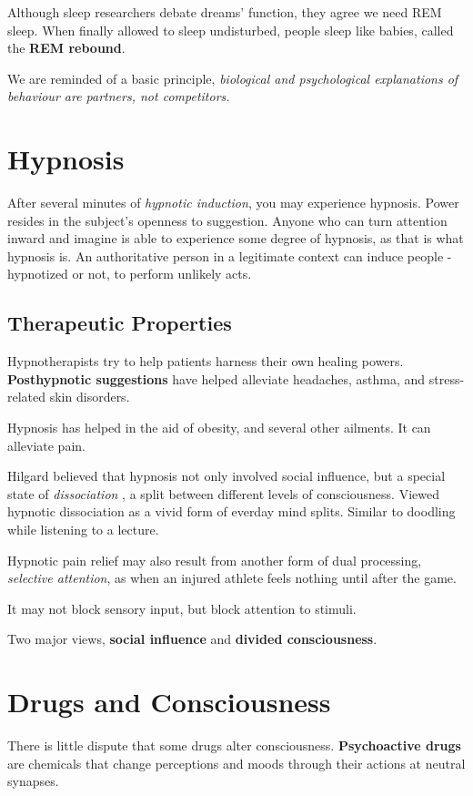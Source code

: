 \documentclass[12pt]{article}
\begin{document}
Although sleep researchers debate dreams' function, they agree we need REM sleep. When finally allowed to sleep undisturbed, people sleep like babies, called the \textbf{REM rebound}. 

We are reminded of a basic principle, \textit{biological and psychological explanations of behaviour are partners, not competitors.}

\section*{Hypnosis}
After several minutes of \textit{hypnotic induction}, you may experience hypnosis. Power resides in the subject's openness to suggestion. Anyone who can turn attention inward and imagine is able to experience some degree of hypnosis, as that is what hypnosis is. An authoritative person in a legitimate context can induce people - hypnotized or not, to perform unlikely acts.

\subsection*{Therapeutic Properties}
Hypnotherapists try to help patients harness their own healing powers. \textbf{Posthypnotic suggestions} have helped alleviate headaches, asthma, and stress-related skin disorders. 

Hypnosis has helped in the aid of obesity, and several other ailments. It can alleviate pain.

Hilgard believed that hypnosis not only involved social influence, but a special state of \textit{dissociation }, a split between different levels of consciousness. Viewed hypnotic dissociation as a vivid form of everday mind splits. Similar to doodling while listening to a lecture. 

Hypnotic pain relief may also result from another form of dual processing, \textit{selective attention}, as when an injured athlete feels nothing until after the game.

It may not block sensory input, but block attention to stimuli. 

Two major views, \textbf{social influence} and \textbf{divided consciousness}.

\section*{Drugs and Consciousness}
There is little dispute that some drugs alter consciousness. \textbf{Psychoactive drugs} are chemicals that change perceptions and moods through their actions at neutral synapses. 
\end{document}

